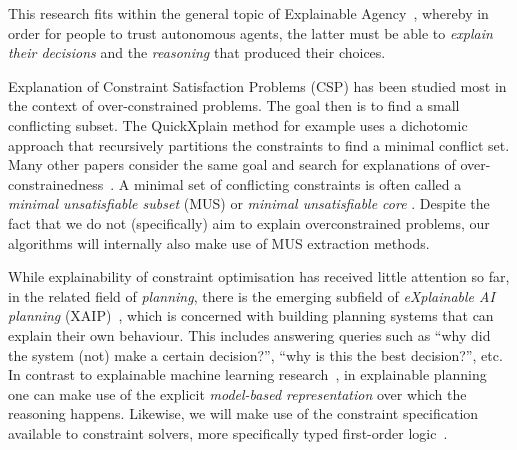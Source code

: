 This research fits within the general topic of Explainable Agency~\cite{langley2017explainable}, whereby in order for people to trust autonomous agents, the latter must be able to \textit{explain their decisions} and the \textit{reasoning} that produced their choices.



Explanation of Constraint Satisfaction Problems (CSP) has been studied most in the context of over-constrained problems.
The goal then is to find a small conflicting subset.
The QuickXplain method \cite{junker2001quickxplain} for example uses a dichotomic approach that recursively partitions the constraints to find a minimal conflict set. Many other papers consider the same goal and search for explanations of over-constrainedness~\cite{leo2017debugging,zeighami2018towards}.
A minimal set of conflicting constraints is often called a \emph{minimal unsatisfiable subset} (MUS) or \emph{minimal unsatisfiable core} \cite{marques2010minimal}. Despite the fact that we do not (specifically) aim to explain overconstrained problems, our algorithms will internally also make use of MUS extraction methods.


While explainability of constraint optimisation has received little attention so far, in the related field of \textit{planning}, there is the emerging subfield of \textit{eXplainable AI planning} (XAIP)~\cite{fox2017explainable}, which is concerned with building planning systems that can explain their own behaviour. This includes answering queries such as ``why did the system (not) make a certain decision?'', ``why is this the best decision?'', etc. In contrast to explainable machine learning research~\cite{guidotti2018survey}, in explainable planning one can make use of the explicit \textit{model-based representation} over which the reasoning happens. Likewise, we will make use of the constraint specification available to constraint solvers, more specifically typed first-order logic~\cite{atcl/Wittocx13}.

% 
% 

